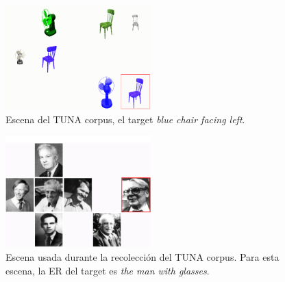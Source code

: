 \begin{figure}[H]
\centering
\includegraphics[width=0.5\textwidth]{images/tuna.jpg}
\caption{Escena del TUNA corpus, el target \emph{blue chair facing left}.}
\label{Tuna-scene}
\end{figure}

\begin{figure}[ht]
\centering
\includegraphics[width=0.5\textwidth]{images/tuna-people.jpg}
\caption{Escena usada durante la recolecci\'on del TUNA corpus. Para esta escena, la ER del target es \emph{the man with glasses}.} 
\label{Tuna-people-scene}
\centering

\end{figure} 


